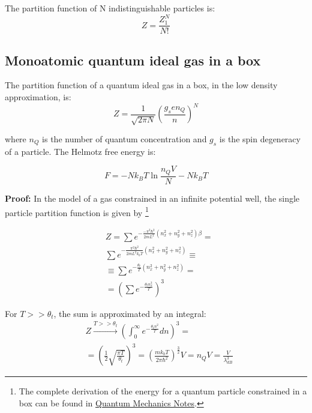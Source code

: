 \documentclass{article}
\begin{document}
\begin{tcolorbox}[colframe=gray!50, colback=gray!10, coltitle=black, title=Indistinguishable Particles Partition Function]
    The partition function of N indistinguishable particles is:
    \begin{equation}
        Z=\frac{Z_1^N}{N!}
    \end{equation}
\end{tcolorbox}
\subsection{Monoatomic quantum ideal gas in a box}

\begin{tcolorbox}[colframe=gray!50, colback=gray!10, coltitle=black, title=Monoatomic Quantum Ideal Gas Z and F]
    The partition function of a quantum ideal gas in a box, in the low density approximation, is:
    \begin{equation}
        Z=\frac{1}{\sqrt{2\pi N}}\left(\frac{g_s e n_Q}{n}\right)^N
    \end{equation}

    where $n_Q$ is the number of quantum concentration and $g_s$ is the spin degeneracy of a particle.
    The Helmotz free energy is:

    \begin{equation}
        F=-Nk_BT\ln{\frac{n_QV}{N}}-Nk_BT
    \end{equation}
\end{tcolorbox}

\textbf{Proof:}
In the model of a gas constrained in an infinite potential well, the single particle partition function is given by
\footnote{
    The complete derivation of the energy for a quantum particle constrained in a box can be found in
    \href{https://cesaresabattini.github.io/Physics-Lecture-Notes/}{Quantum Mechanics Notes}.
}

\begin{align*}
     & Z=\sum e^{-\frac{-\pi^2\hbar^2}{2mL^2}(n_x^2+n_y^2+n_z^2)\beta}=  \\
     & \sum e^{-\frac{\pi^2\hbar^2}{2mL^2k_bT}(n_x^2+n_y^2+n_z^2)}\equiv \\
     & \equiv\sum e^{-\frac{\theta_t}{T}(n_x^2+n_y^2+n_z^2)}=            \\
     & =\left(\sum e^{-\frac{\theta_tn_x^3}{T}}\right)^3
\end{align*}


For $T>>\theta_t$, the sum is approximated by an integral:
\begin{align*}
     & Z \xrightarrow{T>>\theta_t} \left(\int_{0}^{\infty} e^{-\frac{\theta_tn^2}{T}}dn\right)^3=                                                      \\
     & =\left(\frac{1}{2}\sqrt{\frac{\pi T}{\theta_t}}\right)^3= \left(\frac{mk_bT}{2\pi\hbar^2}\right)^{\frac{3}{2}}V= n_QV= \frac{V}{\lambda_{dB}^3}
\end{align*}
\end{document}
